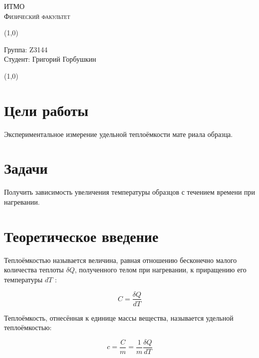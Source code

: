 \documentclass[a4paper]{article}
\begin{document}
\begin{center}
\textsc{ИТМО\\[3mm]
Физический факультет} \\[3mm]

\end{center}
\vspace{5mm}

\vspace{2mm}
\line(1,0){\textwidth}
\vspace{5mm}
\begin{minipage}{0.4\textwidth}
    Группа: Z3144 \\
    Студент: Григорий Горбушкин\\
    \vspace{1mm}
\end{minipage}
\hfill
\vspace{1mm}
\line(1,0){\textwidth}



\section{ \textbf{Цели работы}}

 Экспериментальное измерение удельной теплоёмкости мате
риала образца.

\section{\textbf{Задачи}}

Получить зависимость увеличения температуры образцов с течением времени при нагревании.



\section{\textbf{Теоретическое введение}}

 Теплоёмкостью называется величина, равная отношению бесконечно малого количества теплоты $\delta Q$, полученного телом при нагревании, к приращению его температуры $d T$ :


\begin{equation*}
C=\frac{\delta Q}{d T} \tag{1}
\end{equation*}


Теплоёмкость, отнесённая к единице массы вещества, называется удельной теплоёмкостью:


\begin{equation*}
c=\frac{C}{m}=\frac{1}{m} \frac{\delta Q}{d T} \tag{2}
\end{equation*}
\end{document}

